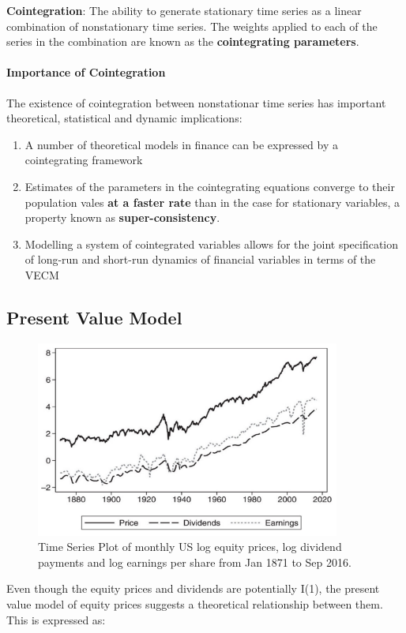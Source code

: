 \documentclass[11pt]{article}
\begin{document}
\begin{definition}
    \textbf{Cointegration}: The ability to generate stationary time series as a linear combination of nonstationary time series. The weights applied to each of the series in the combination are known as the \textbf{cointegrating parameters}.
\end{definition}

\paragraph{Importance of Cointegration} \mbox{}

The existence of cointegration between nonstationar time series has important theoretical, statistical and dynamic implications:
\begin{enumerate}
    \item A number of theoretical models in finance can be expressed by a cointegrating framework
    \item Estimates of the parameters in the cointegrating equations converge to their population vales \textbf{at a faster rate} than in the case for stationary variables, a property known as \textbf{super-consistency}.
    \item Modelling a system of cointegrated variables allows for the joint specification of long-run and short-run dynamics of financial variables in terms of the VECM
\end{enumerate}


\subsection{Present Value Model}

\begin{figure}[h]
    \centering
    \includegraphics[width=10cm]{pics/us equity prices.png}
    \caption{Time Series Plot of monthly US log equity prices, log dividend payments and log earnings per share from Jan 1871 to Sep 2016.}
    \label{fig:us equity prices}
\end{figure}
Even though the equity prices and dividends are potentially I(1), the present value model of equity prices suggests a theoretical relationship between them. This is expressed as:
\end{document}
